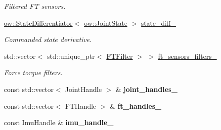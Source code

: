 \begin{DoxyCompactItemize}
\begin{DoxyCompactList}\small\item\em Filtered FT sensors. \end{DoxyCompactList}\item 
\hyperlink{classow__core_1_1StateDifferentiator}{ow\+::\+State\+Differentiator}$<$ \hyperlink{classow__core_1_1JointState}{ow\+::\+Joint\+State} $>$ \hyperlink{classow__hw__interface_1_1Robot_aa91c5a876c54142bb3e79a4fa5515895}{state\+\_\+diff\+\_\+}\hypertarget{classow__hw__interface_1_1Robot_aa91c5a876c54142bb3e79a4fa5515895}{}\label{classow__hw__interface_1_1Robot_aa91c5a876c54142bb3e79a4fa5515895}

\begin{DoxyCompactList}\small\item\em Commanded state derivative. \end{DoxyCompactList}\item 
std\+::vector$<$ std\+::unique\+\_\+ptr$<$ \hyperlink{classow__core_1_1MatrixAlgorithm}{F\+T\+Filter} $>$ $>$ \hyperlink{classow__hw__interface_1_1Robot_a03d3c60123abf150fd5a3e318e4bf8aa}{ft\+\_\+sensors\+\_\+filters\+\_\+}\hypertarget{classow__hw__interface_1_1Robot_a03d3c60123abf150fd5a3e318e4bf8aa}{}\label{classow__hw__interface_1_1Robot_a03d3c60123abf150fd5a3e318e4bf8aa}

\begin{DoxyCompactList}\small\item\em Force torque filters. \end{DoxyCompactList}\item 
const std\+::vector$<$ Joint\+Handle $>$ \& {\bfseries joint\+\_\+handles\+\_\+}\hypertarget{classow__hw__interface_1_1Robot_ae138bda112e60616f97c63d5d773e712}{}\label{classow__hw__interface_1_1Robot_ae138bda112e60616f97c63d5d773e712}

\item 
const std\+::vector$<$ F\+T\+Handle $>$ \& {\bfseries ft\+\_\+handles\+\_\+}\hypertarget{classow__hw__interface_1_1Robot_a33e1305c6886015a206905ba343614c8}{}\label{classow__hw__interface_1_1Robot_a33e1305c6886015a206905ba343614c8}

\item 
const Imu\+Handle \& {\bfseries imu\+\_\+handle\+\_\+}\hypertarget{classow__hw__interface_1_1Robot_ac235e84eb102e2b261e8d3db5b663d20}{}\label{classow__hw__interface_1_1Robot_ac235e84eb102e2b261e8d3db5b663d20}

\end{DoxyCompactItemize}


